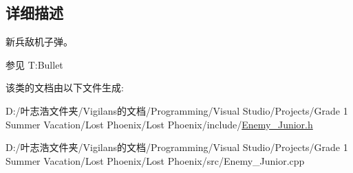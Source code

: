 \subsection{详细描述}
新兵敌机子弹。 

\begin{DoxySeeAlso}{参见}
T\+:\+Bullet


\end{DoxySeeAlso}


该类的文档由以下文件生成\+:\begin{DoxyCompactItemize}
\item 
D\+:/叶志浩文件夹/\+Vigilans的文档/\+Programming/\+Visual Studio/\+Projects/\+Grade 1 Summer Vacation/\+Lost Phoenix/\+Lost Phoenix/include/\hyperlink{_enemy___junior_8h}{Enemy\+\_\+\+Junior.\+h}\item 
D\+:/叶志浩文件夹/\+Vigilans的文档/\+Programming/\+Visual Studio/\+Projects/\+Grade 1 Summer Vacation/\+Lost Phoenix/\+Lost Phoenix/src/Enemy\+\_\+\+Junior.\+cpp\end{DoxyCompactItemize}
